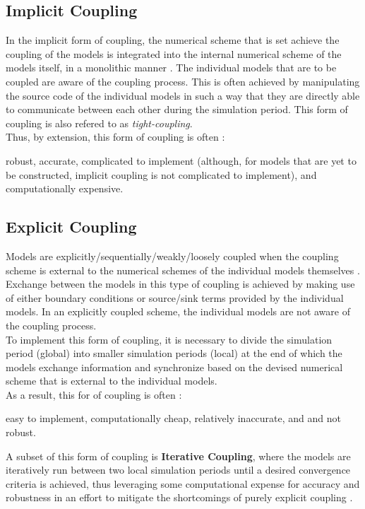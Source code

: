 \subsection{Implicit Coupling}
In the implicit form of coupling, the numerical scheme that is set achieve the coupling of the models is integrated into the internal numerical scheme of the models itself, in a monolithic manner \cite{Morita2002}. The individual models that are to be coupled are aware of the coupling process. This is often achieved by manipulating the source code of the individual models in such a way that they are directly able to communicate between each other during the simulation period. This form of coupling is also refered to as \textit{tight-coupling}.
\\
Thus, by extension, this form of coupling is often \cite{Fernndez2011} \cite{Dunlap2013}:
\begin{itemize}
    \tick robust,
    \tick accurate,
    \cross complicated to implement (although, for models that are yet to be constructed, implicit coupling is not complicated to implement), and
    \cross computationally expensive.
\end{itemize}

\subsection{Explicit Coupling}
Models are explicitly/sequentially/weakly/loosely coupled when the coupling scheme is external to the numerical schemes of the individual models themselves \cite{Morita2002}. Exchange between the models in this type of coupling is achieved by making use of either boundary conditions or source/sink terms provided by the individual models. In an explicitly coupled scheme, the individual models are not aware of the coupling process.
\\
To implement this form of coupling, it is necessary to divide the simulation period (global) into smaller simulation periods (local) at the end of which the models exchange information and synchronize based on the devised numerical scheme that is external to the individual models.
\\
As a result, this for of coupling is often \cite{Fernndez2011} \cite{Dunlap2013}:
\begin{itemize}
    \tick easy to implement,
    \tick computationally cheap,
    \cross relatively inaccurate, and
    \cross and not robust.
\end{itemize}

A subset of this form of coupling is \textbf{Iterative Coupling}, where the models are iteratively run between two local simulation periods until a desired convergence criteria is achieved, thus leveraging some computational expense for accuracy and robustness in an effort to mitigate the shortcomings of purely explicit coupling \cite{Barthel2016} \cite{Morita2002}.


\endinput